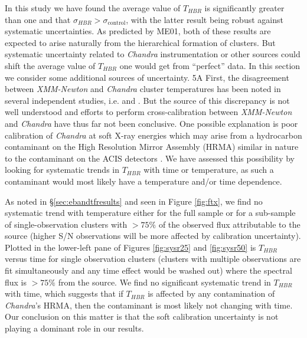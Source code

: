 In this study we have found the average value of $T_{HBR}$ is
significantly greater than one and that $\sigma_{HBR} >
\sigma_{\mathrm{control}}$, with the latter result being robust
against systematic uncertainties. As predicted by ME01, both of these
results are expected to arise naturally from the hierarchical
formation of clusters. But systematic uncertainty related to {\it
  Chandra} instrumentation or other sources could shift the average
value of $T_{HBR}$ one would get from ``perfect'' data. In this
section we consider some additional sources of uncertainty.
5A
First, the disagreement between {\it XMM-Newton} and {\it Chandra}
cluster temperatures has been noted in several independent studies,
i.e. \citet{2005ApJ...628..655V} and \citet{chanxmmdis}. But the source
of this discrepancy is not well understood and efforts to perform
cross-calibration between {\it XMM-Newton} and {\it Chandra} have thus
far not been conclusive. One possible explanation is poor calibration
of {\it Chandra} at soft X-ray energies which may arise from a
hydrocarbon contaminant on the High Resolution Mirror Assembly (HRMA)
similar in nature to the contaminant on the ACIS detectors
\citep{aciscontaminant}. We have assessed this possibility by looking
for systematic trends in $T_{HBR}$ with time or temperature, as such a
contaminant would most likely have a temperature and/or time
dependence.

As noted in \S\ref{sec:ebandtfresults} and seen in Figure \ref{fig:ftx}, we
find no systematic trend with temperature either for the full sample
or for a sub-sample of single-observation clusters with $> 75\%$ of
the observed flux attributable to the source (higher S/N observations
will be more affected by calibration uncertainty). Plotted in the
lower-left pane of Figures \ref{fig:sysr25} and \ref{fig:sysr50} is
$T_{HBR}$ versus time for single observation clusters (clusters with
multiple observations are fit simultaneously and any time effect would
be washed out) where the spectral flux is $> 75\%$ from the source. We
find no significant systematic trend in $T_{HBR}$ with time, which
suggests that if $T_{HBR}$ is affected by any contamination of {\it
  Chandra}'s HRMA, then the contaminant is most likely not changing
with time. Our conclusion on this matter is that the soft calibration
uncertainty is not playing a dominant role in our results.

